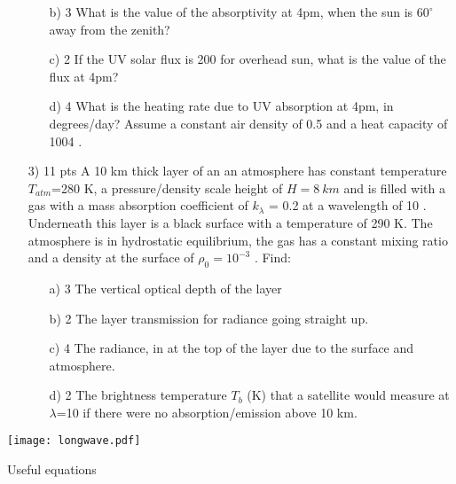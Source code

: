 \documentclass[12pt]{article}
\begin{document}
\begin{enumerate}
\begin{enumerate}
\item[b) 3] What is the value of the absorptivity at 4pm, when the sun is $60^\circ$ away
from the zenith?

\item[c) 2] If the UV solar flux is 200  for overhead sun, what is
the value of the flux at 4pm?

\item[d) 4] What is the heating rate due to UV absorption at 4pm, in degrees/day?   Assume a constant air density
of 0.5   and a heat capacity of 1004 .


\end{enumerate}


\newpage

\item[3) 11 pts] A 10 km thick layer of an an atmosphere has constant temperature
$T_{atm}$=280 K, a pressure/density scale height of $H=8\ km$ and is filled with
a gas with a mass absorption coefficient of $k_\lambda$ = 0.2  
at a wavelength of 10 \mum.  Underneath this layer is a black
surface with a temperature of 290 K. The atmosphere is in hydrostatic
equilibrium, the gas has a constant mixing ratio and a density 
at the surface of $\rho_0 = 10^{-3}$ . Find:

\begin{enumerate}
\item[a) 3]  The vertical optical depth of the layer
\item[b) 2] The layer transmission for radiance going straight up.
\item[c) 4] The radiance, in  
at the top of the layer due to the surface and atmosphere.
\item[d) 2] The brightness temperature $T_b$ (K) that  a satellite would measure
at $\lambda$=10 \mum if there were no absorption/emission above 10 km.

\end{enumerate}


\end{enumerate}



\hspace{-1.5in}
\texttt{[image: longwave.pdf]}


\begin{center}
  Useful equations
\end{center}
\end{document}
